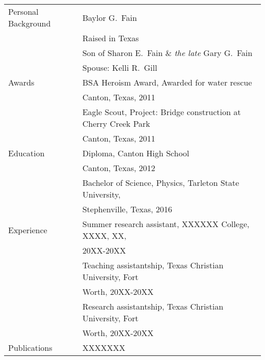 \begin{tabular}{ll}
Personal Background 	 & Baylor G.\ Fain \\
						 & Raised in Texas\\
						 & Son of Sharon E.\ Fain \& \emph{the late} Gary G.\ Fain \\
    					 & Spouse: Kelli R.\ Gill \\[5mm]
Awards                   & BSA Heroism Award, Awarded for water rescue \\   & \hspace{10mm} Canton, Texas, 2011 \\
                         & Eagle Scout, Project: Bridge construction at Cherry Creek Park\\   & \hspace{10mm} Canton, Texas, 2011 \\

Education				 & Diploma, Canton High School \\  & \hspace{10mm} Canton, Texas, 2012 \\
						 & Bachelor of Science, Physics, Tarleton State University, \\  & \hspace{10mm} Stephenville, Texas, 2016 \\
Experience			     & Summer research assistant, XXXXXX College, XXXX, XX, \\	 & \hspace{10mm} 20XX-20XX \\
						 & Teaching assistantship, Texas Christian University, Fort \\ 	 & \hspace{10mm} Worth, 20XX-20XX \\
						 & Research assistantship, Texas Christian University, Fort \\	 & \hspace{10mm} Worth, 20XX-20XX \\[5mm]
Publications &  XXXXXXX \\
\end{tabular}

